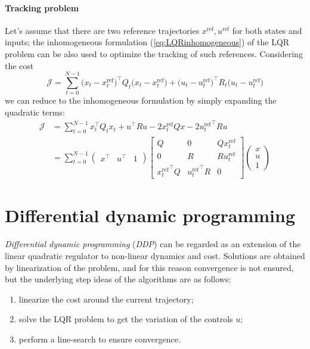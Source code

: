 	\paragraph{Tracking problem} Let's assume that there are two reference trajectories $x^\textrm{ref},u^\textrm{ref}$ for both states and inputs; the inhomogeneous formulation (\ref{eq:LQRinhomogeneous}) of the LQR problem can be also used to optimize the tracking of such references. Considering the cost
	\[ \mathcal J = \sum_{t=0}^{N-1} \big(x_t - x_t^\textrm{ref}\big)^\top Q_t \big(x_t - x_t^\textrm{ref}\big) + \big(u_t - u_t^\textrm{ref}\big)^\top R_t \big(u_t - u_t^\textrm{ref}\big) \]
	we can reduce to the inhomogeneous formulation by simply expanding the quadratic terms:
	\begin{align*}
		\mathcal J & = \sum_{t=0}^{N-1} x_t^\top Q_t x_t + u^\top R u - 2x^\textrm{ref}_t Q x - 2 {u^\textrm{ref}_t}^\top R u \\
		& = \sum_{t=0}^{N-1} \begin{pmatrix}
			x^\top & u^\top & 1
		\end{pmatrix} \begin{bmatrix}
			Q & 0 & Qx^\textrm{ref}_t \\ 0 & R & R u^\textrm{ref}_t \\ {x_t^\textrm{ref}}^\top Q & {u_t^\textrm{ref}}^\top R & 0
		\end{bmatrix} \begin{pmatrix}
			x \\ u \\ 1
		\end{pmatrix}
	\end{align*}
	
\section{Differential dynamic programming}
	\textit{Differential dynamic programming} (\textit{DDP}) can be regarded as an extension of the linear quadratic regulator to non-linear dynamics and cost. Solutions are obtained by linearization of the problem, and for this reason convergence is not ensured, but the underlying step ideas of the algorithms are as follows:
	\begin{enumerate}
		\item linearize the cost around the current trajectory;
		\item solve the LQR problem to get the variation of the controls $u$;
		\item perform a line-search to ensure convergence.
	\end{enumerate}
	

